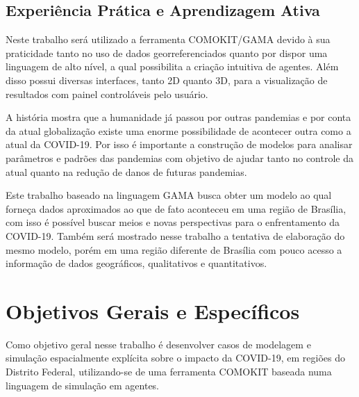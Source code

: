 \subsection{Experiência Prática e Aprendizagem Ativa}

Neste trabalho será utilizado a ferramenta COMOKIT/GAMA devido à sua praticidade tanto no uso de dados georreferenciados quanto por dispor uma linguagem de alto nível, a qual possibilita a criação intuitiva de agentes. Além disso possui diversas interfaces, tanto 2D quanto 3D, para a visualização de resultados com painel controláveis pelo usuário.

A história mostra que a humanidade já passou por outras pandemias e por conta da atual globalização existe uma enorme possibilidade de acontecer outra como a atual da COVID-19. Por isso é importante a construção de modelos para analisar parâmetros e padrões das pandemias com objetivo de ajudar tanto no controle da atual quanto na redução de danos de futuras pandemias. 

Este trabalho baseado na linguagem GAMA busca obter um modelo ao qual forneça dados aproximados ao que de fato aconteceu em uma região de Brasília, com isso é possível buscar meios e novas perspectivas para o enfrentamento da COVID-19.
Também será mostrado nesse trabalho a tentativa de elaboração do mesmo modelo, porém em uma região diferente de Brasília com pouco acesso a informação de dados geográficos, qualitativos e quantitativos.



\section{Objetivos Gerais e Específicos}%

Como objetivo geral nesse trabalho é desenvolver casos de modelagem e simulação espacialmente explícita sobre o impacto da COVID-19, em regiões do Distrito Federal, utilizando-se de uma ferramenta COMOKIT baseada numa linguagem de simulação  em agentes.

